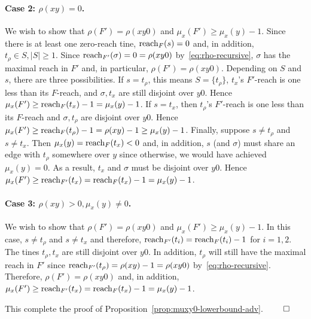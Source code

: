     \paragraph{Case 2: $\rho(xy)=0$.}
    We wish to show that 
    $\rho(F') = \rho(xy0)$ and 
    $\mu_x(F') \geq \mu_x(y) - 1$. 
    Since there is at least one zero-reach tine, $\operatorname{reach}_F(s) = 0$ 
    and, in addition, $t_\rho \in S, |S| \geq 1$.
    Since $\operatorname{reach}_{F'}(\sigma) = 0 = \rho(xy0)$ by~\eqref{eq:rho-recursive}, 
    $\sigma$ has the maximal reach in $F'$ and, 
    in particular, $\rho(F') = \rho(xy0)$.
    Depending on $S$ and $s$, there are three possibilities. 
      If $s = t_\rho$, 
      this means $S=\{t_\rho\}$, 
      $t_x$'s $F'$-reach is one less than 
      its $F$-reach, 
      and $\sigma, t_x$ are still disjoint over $y0$.   
      Hence $\mu_x(F') \geq \operatorname{reach}_F(t_x) - 1 = \mu_x(y)-1$.       
      If $s = t_x$, 
      then 
      $t_\rho$'s $F'$-reach is one less than 
      its $F$-reach 
      and $\sigma, t_\rho$ are disjoint over $y0$. 
      Hence $\mu_x(F') \geq \operatorname{reach}_F(t_\rho) - 1 
      = \rho(xy) -1 \geq \mu_x(y)-1$.
      Finally, suppose $s \neq t_\rho$ and $s \neq t_x$. 
      Then $\mu_x(y) = \operatorname{reach}_F(t_x) < 0$ and, in addition, 
      $s$ (and $\sigma$) must share an edge with $t_\rho$ somewhere over $y$ since otherwise, 
      we would have achieved $\mu_x(y)=0$. 
      As a result, $t_x$ and $\sigma$ must be disjoint over $y0$. 
      Hence $\mu_x(F') \geq \operatorname{reach}_{F'}(t_x) = 
      \operatorname{reach}_F(t_x) - 1 = \mu_x(y) - 1$.

    \paragraph{Case 3: $\rho(xy) > 0,\mu_x(y)\neq 0$.}
    We wish to show that 
    $\rho(F') = \rho(xy0)$ and 
    $\mu_x(F') \geq \mu_x(y) - 1$.
    In this case, $s \neq t_\rho$ and $s \neq t_x$ and therefore, 
    $\operatorname{reach}_{F'}(t_i)=\operatorname{reach}_{F}(t_i)-1$ for $i = {1,2}$. 
    The tines $t_\rho, t_x$ are still disjoint over $y0$. 
    In addition, $t_\rho$ will still have the maximal reach in $F'$ 
    since $\operatorname{reach}_{F'}(t_\rho) = \rho(xy) - 1 = \rho(xy0)$ by~\ref{eq:rho-recursive}. 
    Therefore, 
    $\rho(F') = \rho(xy0)$ and, in addition, 
    $\mu_x(F') \geq \operatorname{reach}_{F'}(t_x) = \operatorname{reach}_{F}(t_x) - 1 = \mu_x(y)-1$.


  This complete the proof of Proposition~\ref{prop:muxy0-lowerbound-adv}.
  \hfill $\qed$



